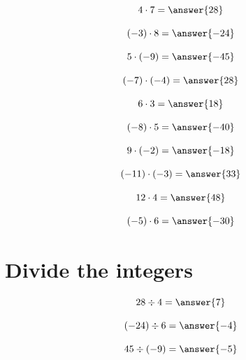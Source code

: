 \documentclass{ximera}
\begin{document}
\begin{problem}
\[
4 \cdot 7 = \answer{28}
\]
\end{problem}

\begin{problem}
\[
(-3) \cdot 8 = \answer{-24}
\]
\end{problem}

\begin{problem}
\[
5 \cdot (-9) = \answer{-45}
\]
\end{problem}

\begin{problem}
\[
(-7) \cdot (-4) = \answer{28}
\]
\end{problem}

\begin{problem}
\[
6 \cdot 3 = \answer{18}
\]
\end{problem}

\begin{problem}
\[
(-8) \cdot 5 = \answer{-40}
\]
\end{problem}

\begin{problem}
\[
9 \cdot (-2) = \answer{-18}
\]
\end{problem}

\begin{problem}
\[
(-11) \cdot (-3) = \answer{33}
\]
\end{problem}

\begin{problem}
\[
12 \cdot 4 = \answer{48}
\]
\end{problem}

\begin{problem}
\[
(-5) \cdot 6 = \answer{-30}
\]
\end{problem}

\section*{Divide the integers}

\begin{problem}
\[
28 \div 4 = \answer{7}
\]
\end{problem}

\begin{problem}
\[
(-24) \div 6 = \answer{-4}
\]
\end{problem}

\begin{problem}
\[
45 \div (-9) = \answer{-5}
\]
\end{problem}
\end{document}
